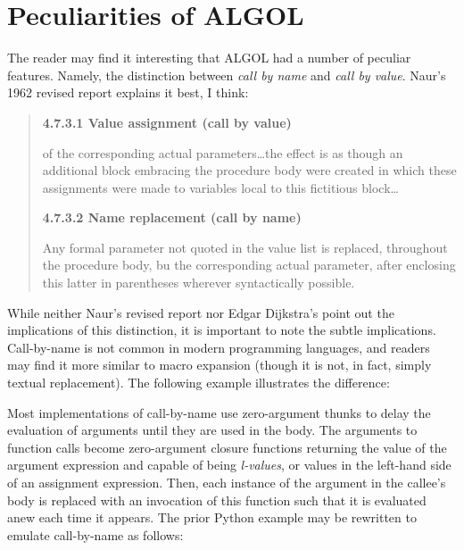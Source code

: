 \section{Peculiarities of ALGOL}

The reader may find it interesting that ALGOL had a number of peculiar features.
Namely, the distinction between \textit{call by name} and \textit{call by value}.
Naur's 1962 revised report explains it best, I think\cite[Section 4.7.3]{naur_revised_report_algol_1962}:

\begin{quotation}
\noindent
\textbf{4.7.3.1 Value assignment (call by value)}

of the corresponding actual parameters\dots the effect is as though an 
additional block embracing the procedure body were created in which these 
assignments were made to variables local to this fictitious block\dots

\noindent
\textbf{4.7.3.2 Name replacement (call by name)}

Any formal parameter not quoted in the value list is replaced, throughout the 
procedure body, bu the corresponding actual parameter, after enclosing this 
latter in parentheses wherever syntactically possible.
\end{quotation}

While neither Naur's revised report nor Edgar Dijkstra's
point out the implications of this distinction, it is important to note
the subtle implications.
Call-by-name is not common in modern programming languages, and readers
may find it more similar to macro expansion
(though it is not, in fact, simply textual replacement).
The following example illustrates the difference:



Most implementations of call-by-name use zero-argument thunks to delay
the evaluation of arguments until they are used in the body.
The arguments to function calls become zero-argument closure functions
returning the value of the argument expression and capable of being
\textit{l-values}, or values in the left-hand side of an assignment expression.
Then, each instance of the argument in the callee's body is replaced
with an invocation of this function such that it is evaluated anew
each time it appears.
The prior Python example may be rewritten to emulate call-by-name as follows:



